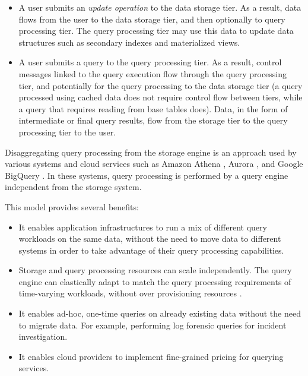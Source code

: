 \begin{itemize}
  \item A user submits an \textit{update operation} to the data storage tier.
  As a result, data flows from the user to the data storage tier, and then optionally to query processing tier.
  The query processing tier may use this data to update data structures such as secondary indexes and materialized views.

  \item A user submits a query to the query processing tier.
  As a result, control messages linked to the query execution flow through the query processing tier, and potentially
  for the query processing to the data storage tier (a query processed using cached data does not require control flow
  between tiers, while a query that requires reading from base tables does).
  Data, in the form of intermediate or final query results, flow from the storage tier to the query processing tier to
  the user.
\end{itemize}

Disaggregating query processing from the storage engine is an approach used by various systems and cloud
services such as Amazon Athena \cite{aws:athena}, Aurora \cite{aws:aurora}, and Google BigQuery
\cite{google:bigquery}.
In these systems, query processing is performed by a query engine independent from the storage system.

This model provides several benefits:
\begin{itemize}
  \item It enables application infrastructures to run a mix of different query workloads on the same data,
  without the need to move data to different systems in order to take advantage of their query processing capabilities.

  \item Storage and query processing resources can scale independently.
  The query engine can elastically adapt to match the query processing requirements of time-varying workloads,
  without over provisioning resources \cite{vuppalapati:elasticqueryengine}.

  \item It enables ad-hoc, one-time queries on already existing data without the need to migrate data.
  For example, performing log forensic queries for incident investigation.

  \item It enables cloud providers to implement fine-grained pricing for querying services.
\end{itemize}

